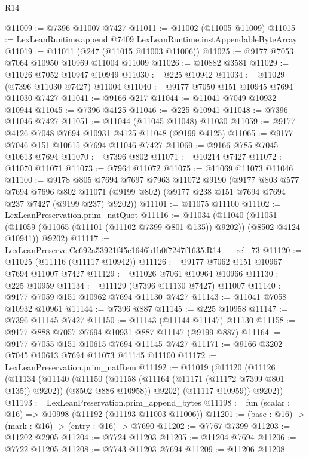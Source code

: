 \begin{lexlean}{R14}
\begin{coremodule}
@11009 := @7396 @11007 @7427
@11011 := @11002 (@11005 @11009)
@11015 := LexLeanRuntime.append @7409 LexLeanRuntime.instAppendableByteArray
@11019 := @11011 (@247 (@11015 @11003 @11006))
@11025 := @9177 @7053 @7064 @10950 @10969 @11004 @11009
@11026 := @10882 @3581
@11029 := @11026 @7052 @10947 @10949
@11030 := @225 @10942
@11034 := @11029 (@7396 @11030 @7427) @11004
@11040 := @9177 @7050 @151 @10945 @7694 @11030 @7427
@11041 := @9166 @217
@11044 := @11041 @7049 @10932 @10944
@11045 := @7396 @4125
@11046 := @225 @10941
@11048 := @7396 @11046 @7427
@11051 := @11044 (@11045 @11048) @11030
@11059 := @9177 @4126 @7048 @7694 @10931 @4125 @11048 (@9199 @4125)
@11065 := @9177 @7046 @151 @10615 @7694 @11046 @7427
@11069 := @9166 @785 @7045 @10613 @7694
@11070 := @7396 @802
@11071 := @10214 @7427
@11072 := @11070 @11071
@11073 := @7964 @11072
@11075 := @11069 @11073 @11046
@11100 := @9178
    @805
    @7694
    @7697
    @7963
    @11072
    @9190
    (@9177
      @803
      @577
      @7694
      @7696
      @802
      @11071
      (@9199 @802)
      (@9177 @238 @151 @7694 @7694 @237 @7427 (@9199 @237) @9202))
@11101 := @11075 @11100
@11102 := LexLeanPreservation.prim_natQuot
@11116 := @11034
    (@11040
      (@11051 (@11059 (@11065 (@11101 (@11102 @7399 @801 @135)) @9202)) (@8502 @4124 @10941))
      @9202)
@11117 := LexLeanPreserve.Cc692a53921f45e1646b1b0f7247f1635.R14.__rel_73
@11120 := @11025 (@11116 (@11117 @10942))
@11126 := @9177 @7062 @151 @10967 @7694 @11007 @7427
@11129 := @11026 @7061 @10964 @10966
@11130 := @225 @10959
@11134 := @11129 (@7396 @11130 @7427) @11007
@11140 := @9177 @7059 @151 @10962 @7694 @11130 @7427
@11143 := @11041 @7058 @10932 @10961
@11144 := @7396 @887
@11145 := @225 @10958
@11147 := @7396 @11145 @7427
@11150 := @11143 (@11144 @11147) @11130
@11158 := @9177 @888 @7057 @7694 @10931 @887 @11147 (@9199 @887)
@11164 := @9177 @7055 @151 @10615 @7694 @11145 @7427
@11171 := @9166 @3202 @7045 @10613 @7694 @11073 @11145 @11100
@11172 := LexLeanPreservation.prim_natRem
@11192 := @11019
    (@11120
      (@11126
        (@11134
          (@11140
            (@11150 (@11158 (@11164 (@11171 (@11172 @7399 @801 @135)) @9202)) (@8502 @886 @10958))
            @9202)
          (@11117 @10959))
        @9202))
@11193 := LexLeanPreservation.prim_append_bytes
@11198 := fun (scalar : @16) => @10998 (@11192 (@11193 @11003 @11006))
@11201 := (base : @16) -> (mark : @16) -> (entry : @16) -> @7690
@11202 := @7767 @7399
@11203 := @11202 @2905
@11204 := @7724 @11203
@11205 := @11204 @7694
@11206 := @7722 @11205
@11208 := @7743 @11203 @7694
@11209 := @11206 @11208

\end{coremodule}
\end{lexlean}
